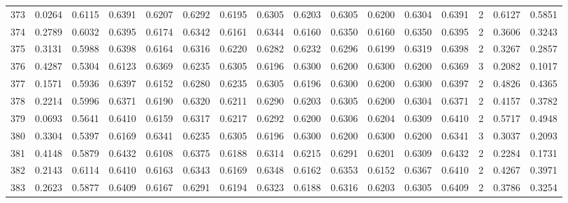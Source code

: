 \begin{tabular}{lrrrrrrrrrrrrrrr}
373 &      0.0264 &  0.6115 &  0.6391 &  0.6207 &  0.6292 &  0.6195 &  0.6305 &  0.6203 &  0.6305 &  0.6200 &   0.6304 &     0.6391 &      2 &                    0.6127 &                     0.5851 \\
374 &      0.2789 &  0.6032 &  0.6395 &  0.6174 &  0.6342 &  0.6161 &  0.6344 &  0.6160 &  0.6350 &  0.6160 &   0.6350 &     0.6395 &      2 &                    0.3606 &                     0.3243 \\
375 &      0.3131 &  0.5988 &  0.6398 &  0.6164 &  0.6316 &  0.6220 &  0.6282 &  0.6232 &  0.6296 &  0.6199 &   0.6319 &     0.6398 &      2 &                    0.3267 &                     0.2857 \\
376 &      0.4287 &  0.5304 &  0.6123 &  0.6369 &  0.6235 &  0.6305 &  0.6196 &  0.6300 &  0.6200 &  0.6300 &   0.6200 &     0.6369 &      3 &                    0.2082 &                     0.1017 \\
377 &      0.1571 &  0.5936 &  0.6397 &  0.6152 &  0.6280 &  0.6235 &  0.6305 &  0.6196 &  0.6300 &  0.6200 &   0.6300 &     0.6397 &      2 &                    0.4826 &                     0.4365 \\
378 &      0.2214 &  0.5996 &  0.6371 &  0.6190 &  0.6320 &  0.6211 &  0.6290 &  0.6203 &  0.6305 &  0.6200 &   0.6304 &     0.6371 &      2 &                    0.4157 &                     0.3782 \\
379 &      0.0693 &  0.5641 &  0.6410 &  0.6159 &  0.6317 &  0.6217 &  0.6292 &  0.6200 &  0.6306 &  0.6204 &   0.6309 &     0.6410 &      2 &                    0.5717 &                     0.4948 \\
380 &      0.3304 &  0.5397 &  0.6169 &  0.6341 &  0.6235 &  0.6305 &  0.6196 &  0.6300 &  0.6200 &  0.6300 &   0.6200 &     0.6341 &      3 &                    0.3037 &                     0.2093 \\
381 &      0.4148 &  0.5879 &  0.6432 &  0.6108 &  0.6375 &  0.6188 &  0.6314 &  0.6215 &  0.6291 &  0.6201 &   0.6309 &     0.6432 &      2 &                    0.2284 &                     0.1731 \\
382 &      0.2143 &  0.6114 &  0.6410 &  0.6163 &  0.6343 &  0.6169 &  0.6348 &  0.6162 &  0.6353 &  0.6152 &   0.6367 &     0.6410 &      2 &                    0.4267 &                     0.3971 \\
383 &      0.2623 &  0.5877 &  0.6409 &  0.6167 &  0.6291 &  0.6194 &  0.6323 &  0.6188 &  0.6316 &  0.6203 &   0.6305 &     0.6409 &      2 &                    0.3786 &                     0.3254 \\

\end{tabular}
